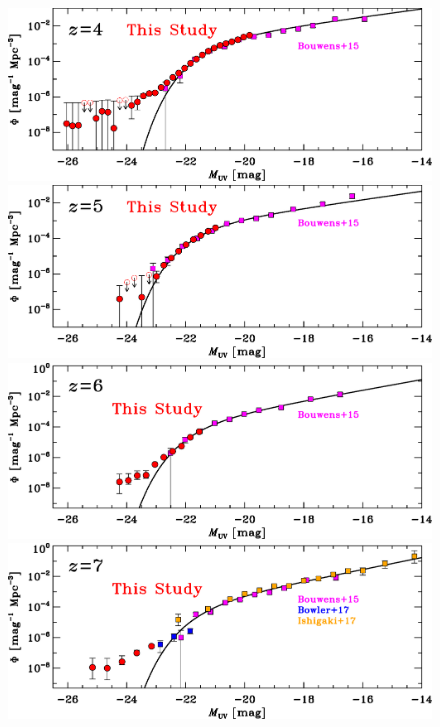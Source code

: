 \documentclass[]{pasj01}
\begin{document}
\begin{figure}
 \begin{center}
  \includegraphics[width=14cm]{lumi_func_z4_selected.eps} 
  \includegraphics[width=14cm]{lumi_func_z5_selected.eps} 
  \includegraphics[width=14cm]{lumi_func_z6_selected.eps} 
  \includegraphics[width=14cm]{lumi_func_z7_selected.eps} 
 \end{center}

\end{figure}
\end{document}
